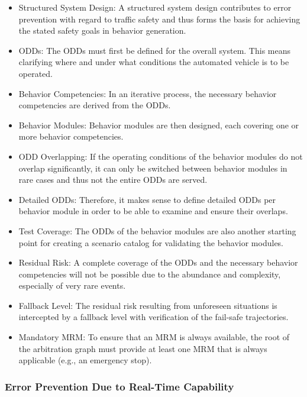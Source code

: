 \begin{itemize}
    \item Structured System Design: A structured system design contributes to error prevention with regard to traffic safety and thus forms the basis for achieving the stated safety goals in behavior generation.
    \item ODDs: The ODDs must first be defined for the overall system. This means clarifying where and under what conditions the automated vehicle is to be operated.
    \item Behavior Competencies: In an iterative process, the necessary behavior competencies are derived from the ODDs.
    \item Behavior Modules: Behavior modules are then designed, each covering one or more behavior competencies.
    \item ODD Overlapping: If the operating conditions of the behavior modules do not overlap significantly, it can only be switched between behavior modules in rare cases and thus not the entire ODDs are served.
    \item Detailed ODDs: Therefore, it makes sense to define detailed ODDs per behavior module in order to be able to examine and ensure their overlaps.
    \item Test Coverage: The ODDs of the behavior modules are also another starting point for creating a scenario catalog for validating the behavior modules.
    \item Residual Risk: A complete coverage of the ODDs and the necessary behavior competencies will not be possible due to the abundance and complexity, especially of very rare events.
    \item Fallback Level: The residual risk resulting from unforeseen situations is intercepted by a fallback level with verification of the fail-safe trajectories.
    \item Mandatory MRM: To ensure that an MRM is always available, the root of the arbitration graph must provide at least one MRM that is always applicable (e.g., an emergency stop).
\end{itemize}

\subsubsection*{Error Prevention Due to Real-Time Capability}

